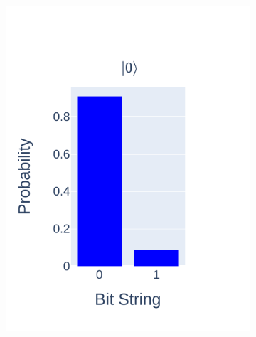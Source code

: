 \documentclass[journal]{IEEEtran}
\begin{document}
\begin{figure}
    \centering
    \begin{subfigure}{0.25\textwidth}
        \centering
        \includegraphics[scale=0.8, trim={10 20 10 25 }, clip]{figures/state_teleport/zero_results.pdf}
    \end{subfigure}
    \begin{subfigure}{0.2\textwidth}
        \centering

\end{subfigure}
\end{figure}
\end{document}
